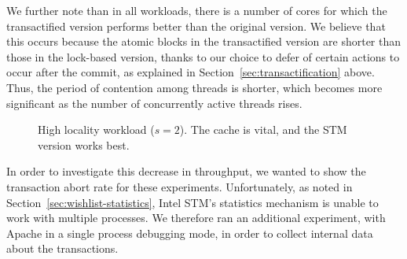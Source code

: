 \documentclass[preprint,11pt]{sigplanconf}
\begin{document}
We further note than in all workloads, there is 
a number of cores for which the transactified version performs 
better than the original version. We believe that this occurs 
because the atomic blocks in the transactified version are 
shorter than those in the lock-based version, thanks to our
choice to defer of certain actions to occur after the commit,
as explained in Section~\ref{sec:transactification} above.
Thus, the period of contention among threads is shorter,
which becomes more significant as the number of concurrently
active threads rises.

\begin{figure}
 \centering
 \hfill
 \caption{High locality workload ($s = 2$). The cache is vital, and 
 the STM version works best.}
\end{figure}

In order to investigate this decrease in throughput, we wanted to show the
transaction abort rate for these experiments. Unfortunately, as noted in
Section~\ref{sec:wishlist-statistics}, Intel STM's statistics mechanism
is unable to work with multiple processes. We therefore ran an additional
experiment, with Apache in a single process debugging mode, in order to collect
internal data about the transactions. 
\end{document}
